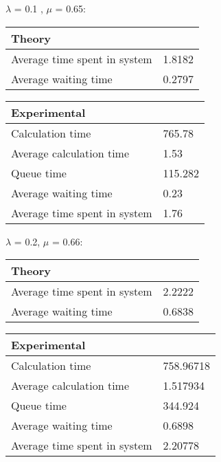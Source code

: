 \begin{minipage}{\linewidth}
    $\lambda$ = 0.1 , $\mu$ = 0.65:

    \bigskip
    \begin{minipage}{0.45\linewidth}
        \begin{tabular}{|l|l|}
            \hline
            Theory & \\
            \hline
            Average time spent in system & 1.8182 \\
            Average waiting time & 0.2797 \\
            \hline
        \end{tabular}
    \end{minipage}
    \begin{minipage}{0.45\linewidth}
        \begin{tabular}{|l|l|}
            \hline
            Experimental & \\
            \hline
            Calculation time & 765.78 \\
            Average calculation time & 1.53 \\
            Queue time & 115.282 \\
            Average waiting time & 0.23 \\
            Average time spent in system & 1.76 \\
            \hline
        \end{tabular}
    \end{minipage}
    \bigskip
\end{minipage}

\begin{minipage}{\linewidth}
    $\lambda$ = 0.2, $\mu$ = 0.66:

    \bigskip
    \begin{minipage}{0.45\linewidth}
        \begin{tabular}{|l|l|}
            \hline
            Theory & \\
            \hline
            Average time spent in system & 2.2222 \\
            Average waiting time & 0.6838 \\
            \hline
        \end{tabular}
    \end{minipage}
    \begin{minipage}{0.45\linewidth}
        \begin{tabular}{|l|l|}
            \hline
            Experimental & \\
            \hline
            Calculation time & 758.96718 \\
            Average calculation time & 1.517934 \\
            Queue time & 344.924 \\
            Average waiting time & 0.6898 \\
            Average time spent in system & 2.20778 \\
            \hline
        \end{tabular}
    \end{minipage}
    \bigskip
\end{minipage}

